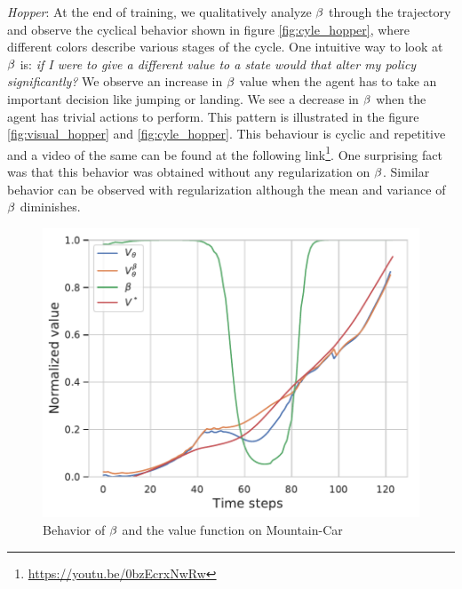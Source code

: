 \emph{Hopper}: At the end of training, we qualitatively analyze $\beta$ through the trajectory and observe the cyclical behavior shown in figure \ref{fig:cyle_hopper}, where different colors describe various stages of the cycle. One intuitive way to look at $\beta$ is: \emph{if I were to give a different value to a state would that alter my policy significantly?} We observe an increase in $\beta$ value when the agent has to take an important decision like jumping or landing. We see a decrease in $\beta$ when the agent has trivial actions to perform. This pattern is illustrated in the figure \ref{fig:visual_hopper} and \ref{fig:cyle_hopper}. This behaviour is cyclic and repetitive and a video of the same can be found at the following link\footnote{\url{https://youtu.be/0bzEcrxNwRw}{}}. One surprising fact was that this behavior was obtained without any regularization on $\beta$. Similar behavior can be observed with regularization although the mean and variance of $\beta$ diminishes.\\
 \begin{figure}
     \centering
     \includegraphics[scale=0.45]{fig/mountain.pdf}
     \caption{Behavior of $\beta$ and the value function on Mountain-Car}
     \label{fig:my_label}\label{mountain_car}
 \end{figure}
